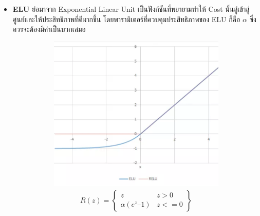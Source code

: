 \begin{itemize}
    \item \textbf{ELU} ย่อมาจาก Exponential Linear Unit เป็นฟังก์ชันที่พยายามทำให้ Cost นั้นลู่เข้าสู่ศูนย์และให้ประสิทธิภาพที่ดีมากขึ้น
    โดยพารามิเตอร์ที่ควบคุมประสิทธิภาพของ ELU ก็คือ $\alpha$ ซึ่งควรจะต้องมีค่าเป็นบวกเสมอ
    \begin{figure}[H]
        \centering
        \begin{subfigure}{0.5\textwidth}
            \centering
            \includegraphics[width=0.9\linewidth]{fig/actfunc_elu.png}
            \caption{%
                \begin{equation}
                    \begin{split}R(z) = \begin{Bmatrix} z & z > 0 \\
                        \alpha (e^z – 1) & z <= 0 \end{Bmatrix}\end{split}
                \end{equation}
            }
            \label{fig:actfunc_elu}
        \end{subfigure}%
        \begin{subfigure}{0.5\textwidth}
            \centering

\end{subfigure}
\end{figure}
\end{itemize}

